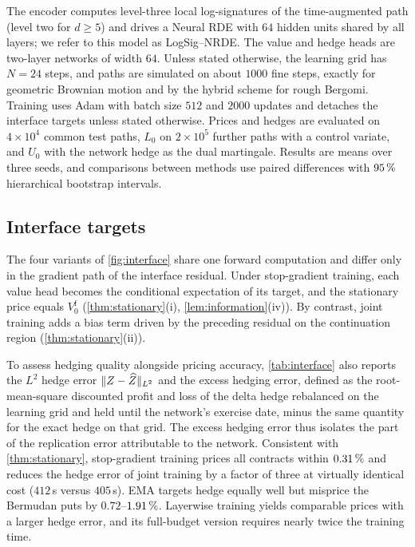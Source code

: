 The encoder computes level-three local log-signatures of the time-augmented path (level two for $d\ge5$) and drives a Neural RDE with $64$ hidden units shared by all layers; we refer to this model as LogSig--NRDE. The value and hedge heads are two-layer networks of width $64$. Unless stated otherwise, the learning grid has $N=24$ steps, and paths are simulated on about $1000$ fine steps, exactly for geometric Brownian motion and by the hybrid scheme \cite{bennedsen2017} for rough Bergomi. Training uses Adam with batch size $512$ and $2000$ updates and detaches the interface targets unless stated otherwise. Prices and hedges are evaluated on $4\times10^4$ common test paths, $L_0$ on $2\times10^5$ further paths with a control variate, and $U_0$ with the network hedge as the dual martingale. Results are means over three seeds, and comparisons between methods use paired differences with $95\,\%$ hierarchical bootstrap intervals.

\subsection{Interface targets}\label{sec:exp-interface}

The four variants of \cref{fig:interface} share one forward computation and differ only in the gradient path of the interface residual. Under stop-gradient training, each value head becomes the conditional expectation of its target, and the stationary price equals $V_0^{\mathrm f}$ (\cref{thm:stationary}(i), \cref{lem:information}(iv)). By contrast, joint training adds a bias term driven by the preceding residual on the continuation region (\cref{thm:stationary}(ii)).


To assess hedging quality alongside pricing accuracy, \cref{tab:interface} also reports the $L^2$ hedge error $\|Z-\widehat Z\|_{L^2}$ and the excess hedging error, defined as the root-mean-square discounted profit and loss of the delta hedge rebalanced on the learning grid and held until the network's exercise date, minus the same quantity for the exact hedge on that grid. The excess hedging error thus isolates the part of the replication error attributable to the network. Consistent with \cref{thm:stationary}, stop-gradient training prices all contracts within $0.31\,\%$ and reduces the hedge error of joint training by a factor of three at virtually identical cost ($412$\,s versus $405$\,s). EMA targets hedge equally well but misprice the Bermudan puts by $0.72$--$1.91\,\%$. Layerwise training yields comparable prices with a larger hedge error, and its full-budget version requires nearly twice the training time.


